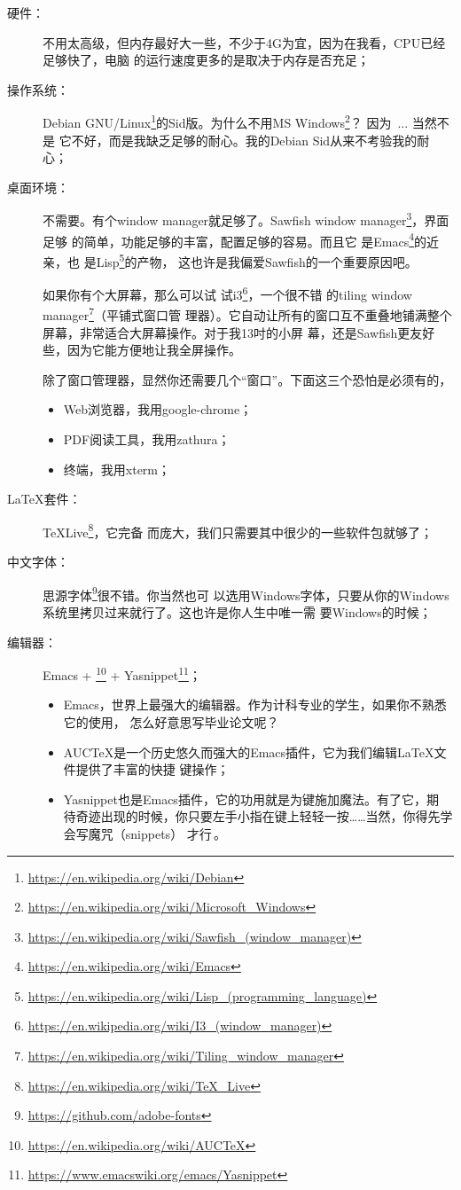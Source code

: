 \documentclass{swfcthesis}
\begin{document}
\begin{description}
\item[硬件：]不用太高级，但内存最好大一些，不少于4G为宜，因为在我看，CPU已经足够快了，电脑
  的运行速度更多的是取决于内存是否充足；
\item[操作系统：]Debian
  GNU/Linux\footnote{\url{https://en.wikipedia.org/wiki/Debian}}的Sid版。为什么不用MS
  Windows\footnote{\url{https://en.wikipedia.org/wiki/Microsoft_Windows}}？ 因为~... 当然不是
  它不好，而是我缺乏足够的耐心。我的Debian Sid从来不考验我的耐心；
\item[桌面环境：]不需要。有个window manager就足够了。Sawfish window
  manager\footnote{\url{https://en.wikipedia.org/wiki/Sawfish_(window_manager)}}，界面足够
  的简单，功能足够的丰富，配置足够的容易。而且它
  是Emacs\footnote{\url{https://en.wikipedia.org/wiki/Emacs}}的近亲，也
  是Lisp\footnote{\url{https://en.wikipedia.org/wiki/Lisp_(programming_language)}}的产物，
  这也许是我偏爱Sawfish的一个重要原因吧。

  如果你有个大屏幕，那么可以试
  试i3\footnote{\url{https://en.wikipedia.org/wiki/I3_(window_manager)}}，一个很不错
  的tiling window
  manager\footnote{\url{https://en.wikipedia.org/wiki/Tiling_window_manager}}（平铺式窗口管
  理器）。它自动让所有的窗口互不重叠地铺满整个屏幕，非常适合大屏幕操作。对于我13吋的小屏
  幕，还是Sawfish更友好些，因为它能方便地让我全屏操作。

  除了窗口管理器，显然你还需要几个“窗口”。下面这三个恐怕是必须有的，

  \begin{itemize}
  \item Web浏览器，我用google-chrome；
  \item PDF阅读工具，我用zathura；
  \item 终端，我用xterm；
  \end{itemize}

\item[\LaTeX{}套件：]TeXLive\footnote{\url{https://en.wikipedia.org/wiki/TeX_Live}}，它完备
  而庞大，我们只需要其中很少的一些软件包就够了；
\item[中文字体：] 思源字体\footnote{\url{https://github.com/adobe-fonts}}很不错。你当然也可
  以选用Windows字体，只要从你的Windows系统里拷贝过来就行了。这也许是你人生中唯一需
  要Windows的时候；
\item[编辑器：]Emacs + \auctex\footnote{\url{https://en.wikipedia.org/wiki/AUCTeX}} +
  Yasnippet\footnote{\url{https://www.emacswiki.org/emacs/Yasnippet}}；

  \begin{itemize}
  \item Emacs，世界上最强大的编辑器。\cite{emacs}作为计科专业的学生，如果你不熟悉它的使用，
    怎么好意思写毕业论文呢？
  \item AUC\TeX{}是一个历史悠久而强大的Emacs插件，它为我们编辑\LaTeX{}文件提供了丰富的快捷
    键操作；\cite{auctex}
  \item Yasnippet也是Emacs插件，它的功用就是为\Tab{}键施加魔法。\cite{yasnippet}有了它，期
    待奇迹出现的时候，你只要左手小指在\Tab{}键上轻轻一按……当然，你得先学会写魔咒（snippets）
    才行\,\Frowny{}。\label{p:yasnippet}
  \end{itemize}


\end{description}
\end{document}
